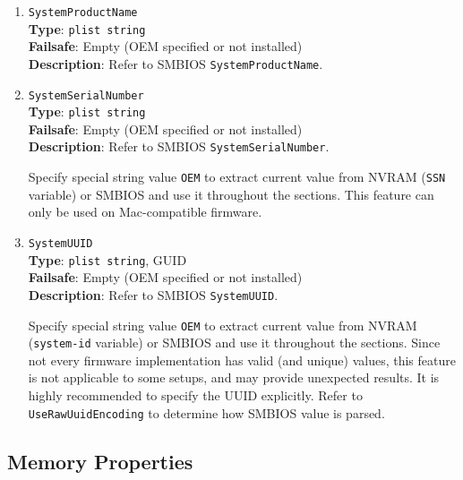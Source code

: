 \documentclass[]{article}
\makeatletter
\renewcommand{\label}[1]{%
\zref@wrapper@immediate{\oldlabel{#1}}}  %
\makeatother
\begin{document}
\begin{enumerate}
  \emph{Note}: On certain Mac models, such as the \texttt{MacBookPro10,x} and any \texttt{MacBookAir},
  SPMemoryReporter.spreporter will ignore \texttt{PT\_FEATURE\_HAS\_SOLDERED\_SYSTEM\_MEMORY}
  and assume that system memory is non-upgradable.

\item
  \texttt{SystemProductName}\\
  \textbf{Type}: \texttt{plist\ string}\\
  \textbf{Failsafe}: Empty (OEM specified or not installed)\\
  \textbf{Description}: Refer to SMBIOS \texttt{SystemProductName}.
\item
  \texttt{SystemSerialNumber}\\
  \textbf{Type}: \texttt{plist\ string}\\
  \textbf{Failsafe}: Empty (OEM specified or not installed)\\
  \textbf{Description}: Refer to SMBIOS \texttt{SystemSerialNumber}.

  Specify special string value \texttt{OEM} to extract current value from NVRAM
  (\texttt{SSN} variable) or SMBIOS and use it throughout the sections.
  This feature can only be used on Mac-compatible firmware.
\item
  \texttt{SystemUUID}\\
  \textbf{Type}: \texttt{plist\ string}, GUID\\
  \textbf{Failsafe}: Empty (OEM specified or not installed)\\
  \textbf{Description}: Refer to SMBIOS \texttt{SystemUUID}.

  Specify special string value \texttt{OEM} to extract current value from NVRAM
  (\texttt{system-id} variable) or SMBIOS and use it throughout the sections.
  Since not every firmware implementation has valid (and unique) values, this
  feature is not applicable to some setups, and may provide unexpected results.
  It is highly recommended to specify the UUID explicitly. Refer to
  \texttt{UseRawUuidEncoding} to determine how SMBIOS value is parsed.
\end{enumerate}

\subsection{Memory Properties}\label{platforminfomemory}
\end{document}

